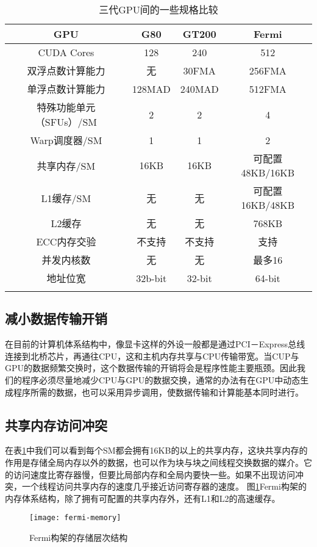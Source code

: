 \begin{longtable}{@{\extracolsep{\fill}}cccc}
\caption{三代GPU间的一些规格比较}\\\toprule[1pt]
\multicolumn{1}{c}{GPU} &
\multicolumn{1}{c}{G80} &
\multicolumn{1}{c}{GT200} &
\multicolumn{1}{c}{Fermi} \\\midrule
CUDA Cores & 128 & 240 & 512 \\
双浮点数计算能力 & 无 & 30FMA & 256FMA \\
单浮点数计算能力 & 128MAD & 240MAD  & 512FMA \\
特殊功能单元（SFUs）/SM & 2 & 2 & 4 \\
Warp调度器/SM & 1 & 1 & 2 \\
共享内存/SM & 16KB & 16KB & 可配置48KB/16KB \\
L1缓存/SM & 无 & 无 & 可配置16KB/48KB \\
L2缓存 & 无 & 无 & 768KB \\
ECC内存交验 & 不支持 & 不支持 & 支持 \\
并发内核数 & 无 & 无 & 最多16 \\
地址位宽 & 32b-bit & 32-bit & 64-bit \\
\bottomrule[1pt]
\label{tab:5.2}
\end{longtable}
\subsection{减小数据传输开销}
在目前的计算机体系结构中，像显卡这样的外设一般都是通过PCI－Express总线连接到北桥芯片，再通往CPU，这和主机内存共享与CPU传输带宽。当CUP与GPU的数据频繁交换时，这个数据传输的开销将会是程序性能主要瓶颈。因此我们的程序必须尽量地减少CPU与GPU的数据交换，通常的办法有在GPU中动态生成程序所需的数据，也可以采用异步调用，使数据传输和计算能基本同时进行。
\subsection{共享内存访问冲突}
在表\ref{tab:5.2}中我们可以看到每个SM都会拥有16KB的以上的共享内存，这块共享内存的作用是存储全局内存以外的数据，也可以作为块与块之间线程交换数据的媒介。它的访问速度比寄存器慢，但要比局部内存和全局内要快一些。如果不出现访问冲突，一个线程访问共享内存的速度几乎接近访问寄存器的速度。
图\ref{fig:5.11}Fermi构架的内存体系结构，除了拥有可配置的共享内存外，还有L1和L2的高速缓存。
\begin{figure}[!ht]
\centering
\texttt{[image: fermi-memory]}
\caption{Fermi构架的存储层次结构}
\label{fig:5.11}
\end{figure}
